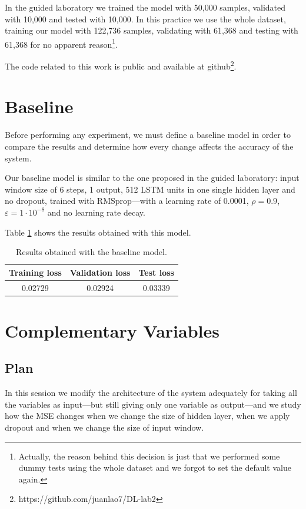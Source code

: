 \documentclass[]{article}
\begin{document}
	In the guided laboratory we trained the model with 50,000 samples, validated with 10,000 and tested with 10,000. In this practice we use the whole dataset, training our model with 122,736 samples, validating with 61,368 and testing with 61,368 for no apparent reason\footnote{Actually, the reason behind this decision is just that we performed some dummy tests using the whole dataset and we forgot to set the default value again.}.
	
	The code related to this work is public and available at github\footnote{https://github.com/juanlao7/DL-lab2}.
	
	\section{Baseline}
	
	Before performing any experiment, we must define a baseline model in order to compare the results and determine how every change affects the accuracy of the system.
	
	Our baseline model is similar to the one proposed in the guided laboratory: input window size of 6 steps, 1 output, 512 LSTM units in one single hidden layer and no dropout, trained with RMSprop---with a learning rate of 0.0001, $ \rho = 0.9 $, $ \varepsilon = 1 \cdot 10^{-8} $ and no learning rate decay.
	
	Table \ref{t:baseline} shows the results obtained with this model.
	
	\begin{table}[H]
		\centering
		\begin{tabular}{@{}ccc@{}}
			\toprule
			Training loss & Validation loss & Test loss \\ \midrule
			0.02729       & 0.02924         & 0.03339   \\ \bottomrule
		\end{tabular}
		\caption{Results obtained with the baseline model.}
		\label{t:baseline}
	\end{table}
	
	\section{Complementary Variables}
	
	\subsection{Plan}
	
	In this session we modify the architecture of the system adequately for taking all the variables as input---but still giving only one variable as output---and we study how the MSE changes when we change the size of hidden layer, when we apply dropout and when we change the size of input window.
	
\end{document}
